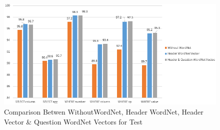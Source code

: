 \documentclass[12pt]{article}
\begin{document}
\begin{figure}[H]
    \includegraphics[width=400pt]{testset}
    \caption{Comparison Betwen WithoutWordNet, Header WordNet, Header Vector \&  Question WordNet Vectors for Test}
    \label{testset}
\end{figure}



\end{document}
